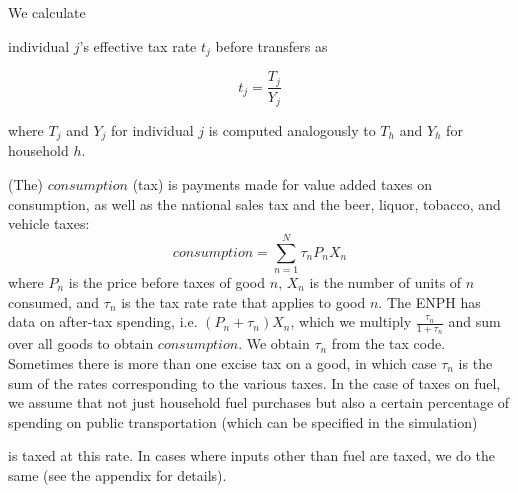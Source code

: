 \documentclass[12pt]{article}
\begin{document}
We calculate
\iffalse
[[SOMEONE:
    Who's ``we''? I don't think I (jbb) have ever calculated this.
    It's certainly not automated.
    Maybe we just mean that we ``define'' it this way,
    although the model never calculates it for any particular person?
]]
\fi
individual $j$'s effective tax rate $t_j$ before transfers as

\begin{equation}
  t_j=\frac
  {T_j}
  {Y_j}
\end{equation}

where $T_j$ and $Y_j$ for individual $j$ is computed analogously to
$T_h$ and $Y_h$ for household $h$.

\iffalse
[[SOMEONE:
    Should $corporate$, described below, be in the numerator
    in the definition of $t_j$?
    --jbb]]

[[SOMEONE:
    It's confusing that, for instance,
    ``consumpetion'' refers to the \textit{tax} on consumption,
    rather than consumption itself.
    I'm thinking $tp_{consumption}$ would be better,
    indicating ``taxes paid on consumption''.
    (`t` would be more terse than `tp`,
    but usually `t` means a tax rate, not a peso amount.)
    --jbb]]
\fi

(The) $consumption$ (tax) is payments made for value added taxes on consumption,
as well as the national sales tax
and the beer, liquor, tobacco, and vehicle taxes:
\begin{equation}
consumption = \sum^{N}_{n=1} \tau_nP_nX_n
\end{equation}
where $P_n$ is the price before taxes of good $n$,
$X_n$ is the number of units of $n$ consumed,
and $\tau_n$ is the tax rate rate that applies to good $n$.
The ENPH has data on after-tax spending,
i.e. $(P_n+\tau_n)X_n$,
which we multiply $\frac{\tau_n}{1+\tau_n}$
and sum over all goods to obtain $consumption$.
We obtain $\tau_n$ from the tax code.
Sometimes there is more than one excise tax on a good,
in which case $\tau_n$ is the sum of
the rates corresponding to the various taxes.
In the case of taxes on fuel,
we assume that not just household fuel purchases but also
a certain percentage of spending on public transportation
(which can be specified in the simulation)
\iffalse
[[SOMEONE:
    I don't think it can, actually.
    Did we promise that before writing the microsimulation,
    or am I forgetting something?
    --jbb]]
\fi
is taxed at this rate.
In cases where inputs other than fuel are taxed, we do the same
(see the appendix for details).
\end{document}
